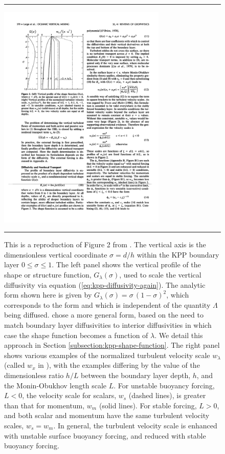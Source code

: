  
\begin{figure}[h!t]
\rule{\textwidth}{0.005in}
\begin{center}
\includegraphics[angle=0,width=8cm]{./figs/LargeKPP_fig2.pdf}
\caption[Figure 2 from \cite{LargeKPP}]{ \sf This is a reproduction of
  Figure 2 from \cite{LargeKPP}.  The vertical axis is the
  dimensionless vertical coordinate $\sigma = d/h$ within the KPP
  boundary layer $0 \le \sigma \le 1$.  The left panel shows the
  vertical profile of the shape or structure function,
  $G_{\lambda}(\sigma)$, used to scale the vertical diffusivity via
  equation (\ref{eq:kpp-diffusivity-again}).  The analytic form shown
  here is given by $G_{\lambda}(\sigma) = \sigma \, (1-\sigma)^{2}$,
  which corresponds to the \cite{Troen_Mahrt1986} form and which is
  independent of the quantity $\Lambda$ being diffused.
  \cite{LargeKPP} chose a more general form, based on the need to
  match boundary layer diffusivities to interior diffusivities in
  which case the shape function becomes a function of $\lambda$.  We
  detail this approach in Section \ref{subsection:kpp-shape-function}.
  The right panel shows various examples of the normalized turbulent
  velocity scale $w_{\lambda}$ (called $w_{x}$ in \cite{LargeKPP}),
  with the examples differing by the value of the dimensionless ratio
  $h/L$ between the boundary layer depth, $h$, and the Monin-Obukhov
  length scale $L$.  For unstable buoyancy forcing, $L<0$, the
  velocity scale for scalars, $w_{s}$ (dashed lines), is greater than
  that for momentum, $w_{m}$ (solid lines).  For stable forcing,
  $L>0$, and both scalar and momentum have the same turbulent velocity
  scales, $w_{s} = w_{m}$.  In general, the turbulent velocity scale
  is enhanced with unstable surface buoyancy forcing, and reduced with
  stable buoyancy forcing.}
\label{fig:kpp-figure2-reproduced}
\end{center}
\rule{\textwidth}{0.005in}
\end{figure}



